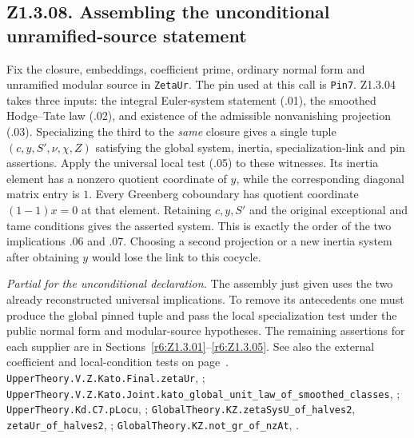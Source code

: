 \subsection{Z1.3.08. Assembling the unconditional unramified-source statement}\label{r6:Z1.3.08}
Fix the closure, embeddings, coefficient prime, ordinary normal form and unramified
modular source in \nolinkurl{ZetaUr}. The pin used at this call is
\nolinkurl{Pin7}. Z1.3.04 takes three inputs: the integral Euler-system
statement (.01), the smoothed Hodge--Tate law (.02), and existence of the
admissible nonvanishing projection (.03). Specializing the third to the
\emph{same} closure gives a single tuple $(c,y,S',\nu,\chi,Z)$ satisfying the
global system, inertia, specialization-link and pin assertions. Apply the
universal local test (.05) to these witnesses. Its inertia element has a
nonzero quotient coordinate of $y$, while the corresponding diagonal matrix
entry is $1$. Every Greenberg coboundary has quotient coordinate $(1-1)x=0$
at that element. Retaining $c,y,S'$ and the original exceptional and tame
conditions gives the asserted system. This is exactly the order of the two
implications .06 and .07. Choosing a second projection or a new inertia
system after obtaining $y$ would lose the link to this cocycle.

\emph{Partial for the unconditional declaration.} The assembly just given
uses the two already reconstructed universal implications. To remove its
antecedents one must produce the global pinned tuple and pass the local
specialization test under the public normal form and modular-source hypotheses.
The remaining assertions for each supplier are in Sections~\ref{r6:Z1.3.01}--\ref{r6:Z1.3.05}.
See also the external coefficient and local-condition tests on
page~\pageref{r6:kato-lit}.
{\footnotesize\nolinkurl{UpperTheory.V.Z.Kato.Final.zetaUr},
;
\nolinkurl{UpperTheory.V.Z.Kato.Joint.kato_global_unit_law_of_smoothed_classes},
;
\nolinkurl{UpperTheory.Kd.C7.pLocu}, ;
\nolinkurl{GlobalTheory.KZ.zetaSysU_of_halves2}, \nolinkurl{zetaUr_of_halves2},
;
\nolinkurl{GlobalTheory.KZ.not_gr_of_nzAt}, .}

